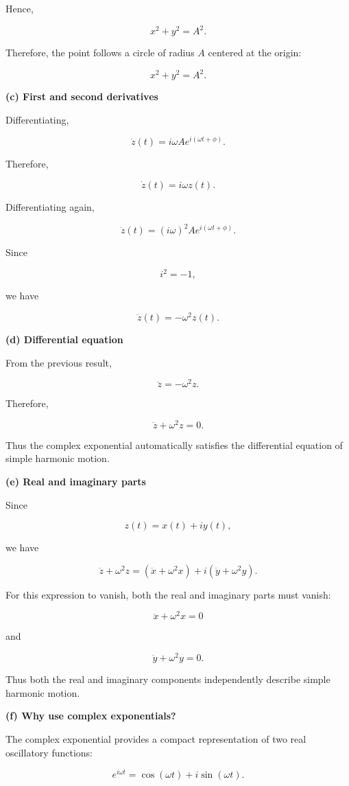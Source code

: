 \documentclass[12pt]{article}
\theoremstyle{remark}
\begin{document}
Hence,

\[
x^2+y^2=A^2.
\]

Therefore, the point follows a circle of radius \(A\) centered at the origin:

\[
\boxed{
x^2+y^2=A^2.
}
\]

\textbf{(c) First and second derivatives}

Differentiating,

\[
\dot z(t)
=
i\omega A e^{i(\omega t+\phi)}.
\]

Therefore,

\[
\boxed{
\dot z(t)=i\omega z(t).
}
\]

Differentiating again,

\[
\ddot z(t)
=
(i\omega)^2 A e^{i(\omega t+\phi)}.
\]

Since

\[
i^2=-1,
\]

we have

\[
\boxed{
\ddot z(t)=-\omega^2 z(t).
}
\]

\textbf{(d) Differential equation}

From the previous result,

\[
\ddot z=-\omega^2z.
\]

Therefore,

\[
\boxed{
\ddot z+\omega^2z=0.
}
\]

Thus the complex exponential automatically satisfies the differential equation of simple harmonic motion.

\textbf{(e) Real and imaginary parts}

Since

\[
z(t)
=
x(t)+iy(t),
\]

we have

\[
\ddot z+\omega^2z
=
\left(\ddot x+\omega^2x\right)
+
i\left(\ddot y+\omega^2y\right).
\]

For this expression to vanish, both the real and imaginary parts must vanish:

\[
\boxed{
\ddot x+\omega^2x=0
}
\]

and

\[
\boxed{
\ddot y+\omega^2y=0.
}
\]

Thus both the real and imaginary components independently describe simple harmonic motion.

\textbf{(f) Why use complex exponentials?}

The complex exponential provides a compact representation of two real oscillatory functions:

\[
e^{i\omega t}
=
\cos(\omega t)+i\sin(\omega t).
\]
\end{document}
